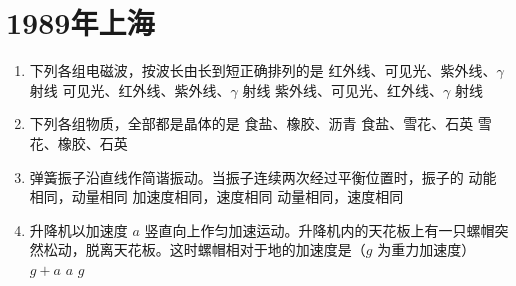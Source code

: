 \documentclass[\gkver]{gaokaozhenti}
\begin{document}
\chapter{1989年上海}

\begin{enumerate}
\item
下列各组电磁波，按波长由长到短正确排列的是
{红外线、可见光、紫外线、$\gamma$ 射线}
{可见光、红外线、紫外线、$\gamma$ 射线}
{紫外线、可见光、红外线、$\gamma$ 射线}


\item
下列各组物质，全部都是晶体的是
{食盐、橡胶、沥青}
{食盐、雪花、石英}
{雪花、橡胶、石英}


\item
弹簧振子沿直线作简谐振动。当振子连续两次经过平衡位置时，振子的
{动能相同，动量相同}
{加速度相同，速度相同}
{动量相同，速度相同}


\item
升降机以加速度 $a$ 竖直向上作匀加速运动。升降机内的天花板上有一只螺帽突然松动，脱离天花板。这时螺帽相对于地的加速度是（$g$ 为重力加速度）
{$g+a$}
{$a$}
{$g$}



\end{enumerate}
\end{document}
